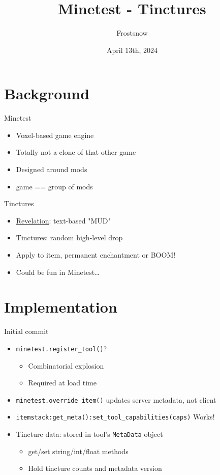 \documentclass{beamer}
\title{Minetest - Tinctures}
\author{Frostsnow}
\date{April 13th, 2024}
\begin{document}
\begin{frame}
  \titlepage
\end{frame}

\section{Background}
\begin{frame}{Minetest}
\begin{itemize}
	\item Voxel-based game engine
	\item Totally not a clone of that other game
	\item Designed around mods
	\item game == group of mods
\end{itemize}
\end{frame}

\begin{frame}{Tinctures}
\begin{itemize}
	\item \underline{Revelation}: text-based "MUD"
	\item Tinctures: random high-level drop
	\item Apply to item, permanent enchantment or BOOM!
	\item Could be fun in Minetest\ldots
\end{itemize}
\end{frame}

\section{Implementation}
\begin{frame}{Initial commit}
\begin{itemize}
	\item \texttt{minetest.register\_tool()}?
	\begin{itemize}
		\item Combinatorial explosion
		\item Required at load time
	\end{itemize}
	\item \texttt{minetest.override\_item()} updates server metadata, not client
	\item \small \texttt{itemstack:get\_meta():set\_tool\_capabilities(caps)} Works!
	\item Tincture data: stored in tool's \texttt{MetaData} object
	\begin{itemize}
		\item get/set string/int/float methods
		\item Hold tincture counts and metadata version
	\end{itemize}
\end{itemize}
\end{frame}
\end{document}
